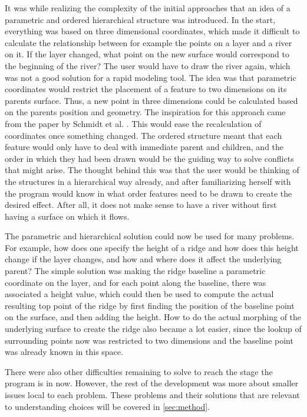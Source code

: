 \documentclass[a4paper,12pt]{report}
\newcommand{\secref}[1]{\autoref{#1}}
\begin{document}
It was while realizing the complexity of the initial approaches that an idea of a parametric and ordered hierarchical structure was introduced. In the start, everything was based on three dimensional coordinates, which made it difficult to calculate the relationship between for example the points on a layer and a river on it. If the layer changed, what point on the new surface would correspond to the beginning of the river? The user would have to draw the river again, which was not a good solution for a rapid modeling tool. The idea was that parametric coordinates would restrict the placement of a feature to two dimensions on its parents surface. Thus, a new point in three dimensions could be calculated based on the parents position and geometry. The inspiration for this approach came from the paper by Schmidt et al. \cite{CGF:CGF1129}. This would ease the recalculation of coordinates once something changed. The ordered structure meant that each feature would only have to deal with immediate parent and 
children, and the order in which they had been drawn would be the guiding way to solve conflicts that might arise. The thought behind this was that the user would be thinking of the structures in a hierarchical way already, and after familiarizing herself with the program would know in what order features need to be drawn to create the desired effect. After all, it does not make sense to have a river without first having a surface on which it flows.

The parametric and hierarchical solution could now be used for many problems. For example, how does one specify the height of a ridge and how does this height change if the layer changes, and how and where does it affect the underlying parent? The simple solution was making the ridge baseline a parametric coordinate on the layer, and for each point along the baseline, there was associated a height value, which could then be used to compute the actual resulting top point of the ridge by first finding the position of the baseline point on the surface, and then adding the height. How to do the actual morphing of the underlying surface to create the ridge also became a lot easier, since the lookup of surrounding points now was restricted to two dimensions and the baseline point was already known in this space.

There were also other difficulties remaining to solve to reach the stage the program is in now. However, the rest of the development was more about smaller issues local to each problem. These problems and their solutions that are relevant to understanding choices will be covered in \secref{sec:method}.
\end{document}

